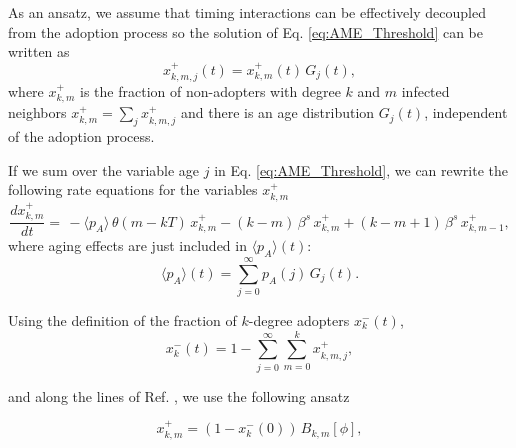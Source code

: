 As an ansatz, we assume that timing interactions can be effectively decoupled from the adoption process so the solution of Eq. \eqref{eq:AME_Threshold} can be written as
\begin{equation}
    \label{eq:assumption1}
    x^{+}_{k,m,j}(t) = x^{+}_{k,m}(t) \, G_{j} (t),
\end{equation}
where $x^{+}_{k,m}$ is the fraction of non-adopters with degree $k$ and $m$ infected neighbors $x^{+}_{k,m} = \sum_{j} x^{+}_{k,m,j}$ and there is an age distribution $G_{j} (t)$, independent of the adoption process.

If we sum over the variable age $j$ in Eq. \eqref{eq:AME_Threshold}, we can rewrite the following rate equations for the variables $x^{+}_{k,m}$
\begin{equation}
    \label{eq:threshold_AME_red}
    \frac{d x^{+}_{k,m}}{dt}  = \,  - \langle p_A \rangle \, \theta(m - kT)\, x^{+}_{k,m} - (k - m) \, \beta^s \,  x^{+}_{k,m} + (k - m + 1)\, \beta^s \,  x^{+}_{k,m-1},
\end{equation}
where aging effects are  just included in $\langle p_A \rangle(t)$: 
\begin{equation}
    \langle p_A \rangle(t) = \sum_{j = 0}^{\infty} p_A(j) \, G_j (t).
\end{equation}

Using the definition of the fraction of $k$-degree adopters $x^{-}_{k} (t)$,
\begin{equation}
    x^{-}_{k}(t) = 1 - \sum_{j=0}^{\infty} \sum_{m = 0}^k x^{+}_{k,m,j},
\end{equation}

and along the lines of Ref. \cite{gleeson-2013}, we use the following ansatz

\begin{equation}
    x^{+}_{k,m} = (1 - x^{-}_{k} (0)) \, B_{k,m}[\phi],
\end{equation}

